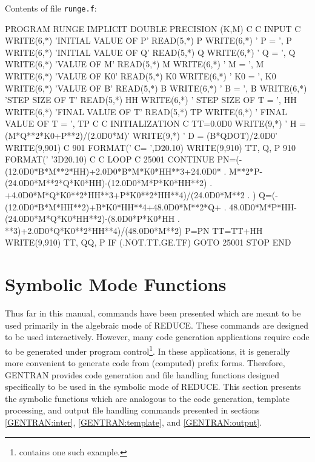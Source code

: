 Contents of file {\tt runge.f}:
\begin{framedverbatim}
      PROGRAM RUNGE
      IMPLICIT DOUBLE PRECISION (K,M)
C
C  INPUT
C
      WRITE(6,*) 'INITIAL VALUE OF P'
      READ(5,*) P
      WRITE(6,*) ' P = ', P
      WRITE(6,*) 'INITIAL VALUE OF Q'
      READ(5,*) Q
      WRITE(6,*) ' Q = ', Q
      WRITE(6,*) 'VALUE OF M'
      READ(5,*) M
      WRITE(6,*) ' M = ', M
      WRITE(6,*) 'VALUE OF K0'
      READ(5,*) K0
      WRITE(6,*) ' K0 = ', K0
      WRITE(6,*) 'VALUE OF B'
      READ(5,*) B
      WRITE(6,*) ' B = ', B
      WRITE(6,*) 'STEP SIZE OF T'
      READ(5,*) HH
      WRITE(6,*) ' STEP SIZE OF T = ', HH
      WRITE(6,*) 'FINAL VALUE OF T'
      READ(5,*) TP
      WRITE(6,*) ' FINAL VALUE OF T = ', TP
C
C  INITIALIZATION
C
      TT=0.0D0                     
      WRITE(9,*) ' H = (M*Q**2*K0+P**2)/(2.0D0*M)'
      WRITE(9,*) ' D = (B*QDOT)/2.0D0'
      WRITE(9,901) C
901   FORMAT(' C= ',D20.10)
      WRITE(9,910) TT, Q, P
910   FORMAT(' '3D20.10)
C
C  LOOP
C
25001 CONTINUE
          PN=(-(12.0D0*B*M**2*HH)+2.0D0*B*M*K0*HH**3+24.0D0*
     .     M**2*P-(24.0D0*M**2*Q*K0*HH)-(12.0D0*M*P*K0*HH**2)
     .     +4.0D0*M*Q*K0**2*HH**3+P*K0**2*HH**4)/(24.0D0*M**2
     .     )
          Q=(-(12.0D0*B*M*HH**2)+B*K0*HH**4+48.0D0*M**2*Q+
     .     48.0D0*M*P*HH-(24.0D0*M*Q*K0*HH**2)-(8.0D0*P*K0*HH
     .     **3)+2.0D0*Q*K0**2*HH**4)/(48.0D0*M**2)
          P=PN
          TT=TT+HH
          WRITE(9,910) TT, QQ, P
      IF (.NOT.TT.GE.TF) GOTO 25001
      STOP
      END
\end{framedverbatim}

\section{Symbolic Mode Functions}

Thus far in this manual, commands have been presented which are meant
to be used primarily in the algebraic mode of REDUCE.  These commands
are designed to be used interactively.  However, many code generation
applications require code to be generated under program control\footnote{
\cite{vandenHeuvel:86ms} contains one such example.}. In these
applications, it is generally more convenient to generate code from
(computed) prefix forms.  Therefore, GENTRAN provides code generation
and file handling functions designed specifically to be used in the
symbolic mode of REDUCE.  This section presents the symbolic functions
which are analogous to the code generation, template processing, and
output file handling commands presented in sections \ref{GENTRAN:inter},
 \ref{GENTRAN:template}, and \ref{GENTRAN:output}.

